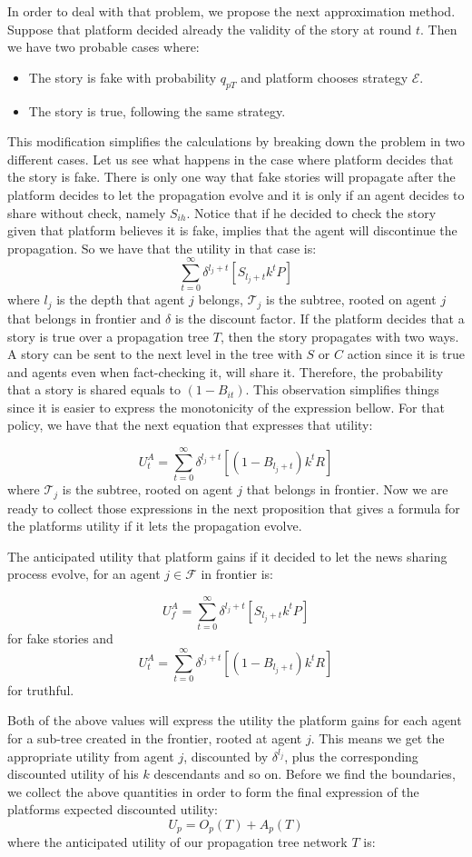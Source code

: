 In order to deal with that problem, we propose the next approximation method. Suppose that platform decided already the validity of the story at round $t$. Then we have two probable cases where:

\begin{itemize}
	\item The story is fake with probability $q_{pT}$ and platform chooses strategy $\mathcal{E}$.
	\item The story is true, following the same strategy.
\end{itemize}
This modification simplifies the calculations by breaking down the problem in two different cases. Let us see what happens in the case where platform decides that the story is fake. There is  only one way that fake stories will propagate after the platform decides to let the propagation evolve and it is only if an agent decides to share without check, namely $S_{ih}$. Notice that if he decided to check the story given that platform believes it is fake, implies that the agent will discontinue the propagation. So we have that the utility in that case is:
$$ \sum_{t=0}^\infty \delta^{l_j+t} \left[ S_{l_j+t} k^t P \right] $$
where $l_j$ is the depth that agent $j$ belongs, $\mathcal{T}_j$ is the subtree, rooted on agent $j$ that belongs in frontier and $\delta$ is the discount factor. If the platform decides that a story is true over a propagation tree $T$, then the story propagates with two ways. A story can be sent to the next level in the tree with $S$ or $C$ action since it is true and agents even when fact-checking it, will share it. Therefore, the probability that a story is shared equals to $(1-B_{it})$. This observation simplifies things since it is easier to express the monotonicity of the expression bellow. For that policy, we have that the next equation that expresses that utility:

$$ U_t^A = \sum_{t=0}^\infty \delta^{l_j+t} \left[ (1-B_{l_j+t}) k^t R  \right]$$where $\mathcal{T}_j$ is the subtree, rooted on agent $j$ that belongs in frontier.
Now we are ready to collect those expressions in the next proposition that gives a formula for the platforms utility if it lets the propagation evolve.


\begin{prop}
	The anticipated utility that platform gains if it decided to let the news sharing process evolve, for an agent $ j \in \mathcal{F}$ in frontier is:
	
	$$ U_f^A = \sum_{t=0}^\infty \delta^{l_j+t} \left[ S_{l_j+t} k^t P \right] $$for fake stories and
	 $$ U_t^A =\sum_{t=0}^\infty \delta^{l_j+t} \left[ (1-B_{l_j+t}) k^t R  \right]$$for truthful.
\end{prop} 
Both of the above values will express the utility the platform gains for each agent for a sub-tree created in the frontier, rooted at agent $j$. This means we get the appropriate utility from agent $j$, discounted by $\delta^{l_j}$, plus the corresponding discounted utility of his $k$ descendants and so on. Before we find the boundaries, we collect the above quantities in order to form the final expression of the platforms expected discounted utility:
$$ U_p = O_p (T) + A_p (T)$$
where the anticipated utility of our propagation tree network $T$ is:


